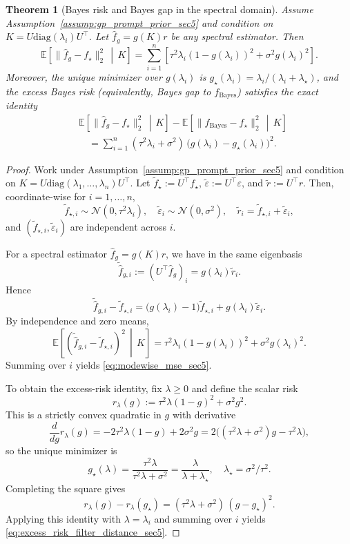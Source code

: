 \documentclass{article}
\theoremstyle{plain}
\newtheorem{theorem}{Theorem}[section]
\theoremstyle{definition}
\theoremstyle{remark}
\begin{document}
\begin{theorem}[Bayes risk and Bayes gap in the spectral domain]
\label{thm:bayes_gap_filter_distance_sec5}
Assume Assumption~\ref{assump:gp_prompt_prior_sec5} and condition on $K=U\mathrm{diag}(\lambda_i)U^\top$.
Let $\hat f_g=g(K)r$ be any spectral estimator. Then
\begin{equation}
\mathbb{E}\!\left[\|\hat f_g - f_\star\|_2^2 \,\middle|\, K\right]
=
\sum_{i=1}^n
\left[
\tau^2\lambda_i(1-g(\lambda_i))^2
+
\sigma^2 g(\lambda_i)^2
\right].
\label{eq:modewise_mse_sec5}
\end{equation}
Moreover, the unique minimizer over $g(\lambda_i)$ is $g_\star(\lambda_i)=\lambda_i/(\lambda_i+\lambda_\star)$,
and the excess Bayes risk (equivalently, Bayes gap to $f_{\mathrm{Bayes}}$) satisfies the exact identity
\begin{align}
&\mathbb{E}\!\left[\|\hat f_g - f_\star\|_2^2 \,\middle|\, K\right]
-
\mathbb{E}\!\left[\|f_{\mathrm{Bayes}} - f_\star\|_2^2 \,\middle|\, K\right] \nonumber\\
&\quad=
\sum_{i=1}^n (\tau^2\lambda_i+\sigma^2)\,\bigl(g(\lambda_i)-g_\star(\lambda_i)\bigr)^2.
\label{eq:excess_risk_filter_distance_sec5}
\end{align}
\end{theorem}

\begin{proof}
Work under Assumption~\ref{assump:gp_prompt_prior_sec5} and condition on
$K=U\mathrm{diag}(\lambda_1,\dots,\lambda_n)U^\top$.
Let $\tilde f_\star:=U^\top f_\star$, $\tilde\varepsilon:=U^\top \varepsilon$, and $\tilde r:=U^\top r$.
Then, coordinate-wise for $i=1,\dots,n$,
\[
\tilde f_{\star,i}\sim\mathcal{N}(0,\tau^2\lambda_i),\quad
\tilde\varepsilon_i\sim\mathcal{N}(0,\sigma^2),
\quad
\tilde r_i=\tilde f_{\star,i}+\tilde\varepsilon_i,
\]
and $(\tilde f_{\star,i},\tilde\varepsilon_i)$ are independent across $i$.

For a spectral estimator $\hat f_g=g(K)r$, we have in the same eigenbasis
\[
\widetilde{\hat f}_{g,i}:=(U^\top \hat f_g)_i = g(\lambda_i)\tilde r_i.
\]
Hence
\[
\widetilde{\hat f}_{g,i}-\tilde f_{\star,i}
=
\bigl(g(\lambda_i)-1\bigr)\tilde f_{\star,i} + g(\lambda_i)\tilde\varepsilon_i.
\]
By independence and zero means,
\[
\mathbb{E}\!\left[(\widetilde{\hat f}_{g,i}-\tilde f_{\star,i})^2 \,\middle|\, K\right]
=
\tau^2\lambda_i(1-g(\lambda_i))^2+\sigma^2 g(\lambda_i)^2.
\]
Summing over $i$ yields \eqref{eq:modewise_mse_sec5}.

To obtain the excess-risk identity, fix $\lambda\ge 0$ and define the scalar risk
\[
r_\lambda(g):=\tau^2\lambda(1-g)^2+\sigma^2 g^2.
\]
This is a strictly convex quadratic in $g$ with derivative
\[
\frac{d}{dg}r_\lambda(g) = -2\tau^2\lambda(1-g)+2\sigma^2 g
=2\bigl((\tau^2\lambda+\sigma^2)g-\tau^2\lambda\bigr),
\]
so the unique minimizer is
\[
g_\star(\lambda)=\frac{\tau^2\lambda}{\tau^2\lambda+\sigma^2}=\frac{\lambda}{\lambda+\lambda_\star},
\quad \lambda_\star=\sigma^2/\tau^2.
\]
Completing the square gives
\[
r_\lambda(g)-r_\lambda(g_\star)=(\tau^2\lambda+\sigma^2)\,(g-g_\star)^2.
\]
Applying this identity with $\lambda=\lambda_i$ and summing over $i$ yields \eqref{eq:excess_risk_filter_distance_sec5}.
\end{proof}
\end{document}
